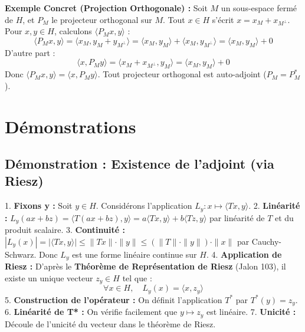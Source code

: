 \documentclass[11pt,a4paper]{article}
\begin{document}
\textbf{Exemple Concret (Projection Orthogonale) :}
Soit $M$ un sous-espace fermé de $H$, et $P_M$ le projecteur orthogonal sur $M$. Tout $x \in H$ s'écrit $x = x_M + x_{M^\perp}$.
Pour $x, y \in H$, calculons $\langle P_M x, y \rangle$ :
$$\langle P_M x, y \rangle = \langle x_M, y_M + y_{M^\perp} \rangle = \langle x_M, y_M \rangle + \langle x_M, y_{M^\perp} \rangle = \langle x_M, y_M \rangle + 0$$
D'autre part :
$$\langle x, P_M y \rangle = \langle x_M + x_{M^\perp}, y_M \rangle = \langle x_M, y_M \rangle + 0$$
Donc $\langle P_M x, y \rangle = \langle x, P_M y \rangle$. Tout projecteur orthogonal est auto-adjoint ($P_M = P_M^*$).


\begin{center}
\end{center}


\section{Démonstrations}

\subsection{Démonstration : Existence de l'adjoint (via Riesz)}

1. \textbf{Fixons y :} Soit $y \in H$. Considérons l'application $L_y : x \mapsto \langle Tx, y \rangle$.
2. \textbf{Linéarité :} $L_y(ax+bz) = \langle T(ax+bz), y \rangle = a \langle Tx, y \rangle + b \langle Tz, y \rangle$ par linéarité de $T$ et du produit scalaire.
3. \textbf{Continuité :} $|L_y(x)| = |\langle Tx, y \rangle| \le \|Tx\| \cdot \|y\| \le (\|T\| \cdot \|y\|) \cdot \|x\|$ par Cauchy-Schwarz.
   Donc $L_y$ est une forme linéaire continue sur $H$.
4. \textbf{Application de Riesz :} D'après le \textbf{Théorème de Représentation de Riesz} (Jalon 103), il existe un unique vecteur $z_y \in H$ tel que :
   $$\forall x \in H, \quad L_y(x) = \langle x, z_y \rangle$$
5. \textbf{Construction de l'opérateur :} On définit l'application $T^*$ par $T^*(y) = z_y$.
6. \textbf{Linéarité de T* :} On vérifie facilement que $y \mapsto z_y$ est linéaire.
7. \textbf{Unicité :} Découle de l'unicité du vecteur dans le théorème de Riesz.
\end{document}
